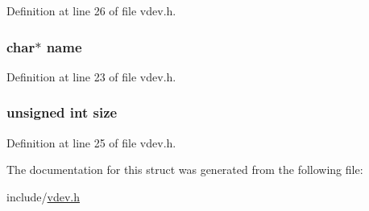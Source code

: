 \-Definition at line 26 of file vdev.\-h.

\hypertarget{structvdev__info__t_a5ac083a645d964373f022d03df4849c8}{
\subsubsection[{name}]{\setlength{\rightskip}{0pt plus 5cm}char$\ast$ {\bf name}}}\label{structvdev__info__t_a5ac083a645d964373f022d03df4849c8}


\-Definition at line 23 of file vdev.\-h.

\hypertarget{structvdev__info__t_aac913b3a1f6ef005d66bf7a84428773e}{
\subsubsection[{size}]{\setlength{\rightskip}{0pt plus 5cm}unsigned int {\bf size}}}\label{structvdev__info__t_aac913b3a1f6ef005d66bf7a84428773e}


\-Definition at line 25 of file vdev.\-h.



\-The documentation for this struct was generated from the following file\-:\begin{DoxyCompactItemize}
\item 
include/\hyperlink{vdev_8h}{vdev.\-h}\end{DoxyCompactItemize}
